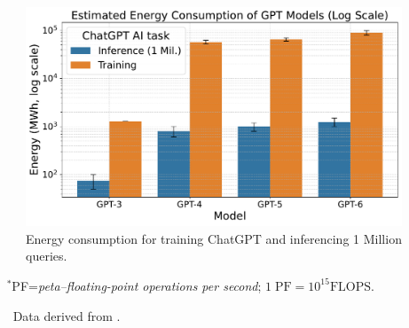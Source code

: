 \begin{figure}[tb]
    \centering
    \includegraphics[width=1.0\linewidth]{images/gpt_energy_comparison.pdf}
    \caption{Energy consumption for training ChatGPT and inferencing 1 Million queries.}
    \label{fig:placeholder}
\end{figure}


\begin{table}[tb]

    \caption{Evolution of the leadership class supercomputer at Oak Ridge National Laboratory}
    \label{tab:ornl-energy}
    

    \smallskip
    {\tiny~~ $^*$PF=\emph{peta–floating-point operations per second}; $1\;\text{PF}=10^{15}\text{FLOPS}.$

    ~~~ Data derived from \cite{papatheodore2022summitfrontier}.
    }
\end{table}

